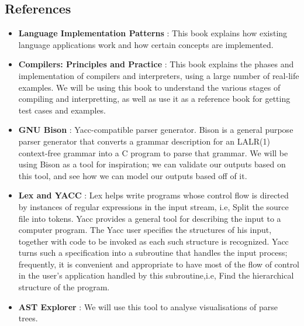 \documentclass[journal,12pt]{IEEEtran}
\begin{document}
\subsection{References}
\begin{itemize}
    \item \textbf{Language Implementation Patterns} \cite{10.5555/1823613}: This book explains how existing language applications work and how certain concepts are implemented.
    \item  \textbf{Compilers: Principles and Practice } \cite{Compilers}: This book explains the phases and implementation of compilers and interpreters, using a large number of real-life examples. We will be using this book to understand the various stages of compiling and interpretting, as well as use it as a reference book for getting test cases and examples.
    \item \textbf{GNU Bison} \cite{GNUBison}:  Yacc-compatible parser generator. Bison is a general purpose parser generator that converts a grammar description for an LALR(1) context-free grammar into a C program to parse that grammar. We will be using Bison as a tool for inspiration; we can validate our outputs based on this tool, and see  how we can model our outputs based off of it.
    \item \textbf{Lex and YACC} \cite{LexYacc}: Lex helps write programs whose control flow is directed by instances of regular expressions in the input stream, i.e, Split the source file into tokens. Yacc provides a general tool for describing the input to a computer program. The Yacc user specifies the structures of his input, together with code to be invoked as each such structure is recognized. Yacc turns such a specification into a subroutine that handles the input process; frequently, it is convenient and appropriate to have most of the flow of control in the user's application handled by this subroutine,i.e, Find the hierarchical structure of the program. 
    \item \textbf{ AST Explorer} \cite{ASTExplorer}: We will use this tool to analyse visualisations of parse trees.


\end{itemize}

\vspace{15pt}


\end{document}
